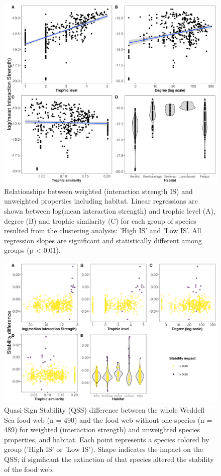 \documentclass[gc, manuscript]{copernicus}
\begin{document}
\begin{figure}
\includegraphics[width=12cm]{Fig4_LinReg} \caption{Relationships between weighted (interaction strength IS) and unweighted properties including habitat. Linear regressions are shown between log(mean interaction strength) and trophic level (A), degree (B) and trophic similarity (C) for each group of species resulted from the clustering analysis: 'High IS' and 'Low IS'. All regression slopes are significant and statistically different among groups (p < 0.01).}\label{fig:unnamed-chunk-4}
\end{figure}

\clearpage

\begin{figure}
\includegraphics[width=12cm]{Fig.5_QSSDif} \caption{Quasi-Sign Stability (QSS) difference between the whole Weddell Sea food web (n = 490) and the food web without one species (n = 489) for weighted (interaction strength) and unweighted species properties, and habitat. Each point represents a species colored by group ('High IS' or 'Low IS'). Shape indicates the impact on the QSS; if significant the extinction of that species altered the stability of the food web.}\label{fig:unnamed-chunk-5}
\end{figure}
\end{document}
